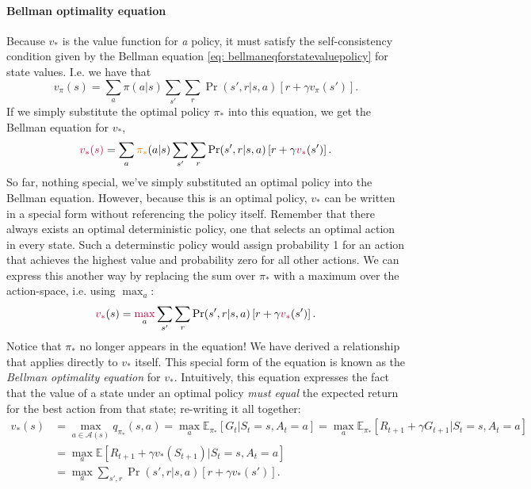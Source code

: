 \documentclass[12pt]{article}
\begin{document}
\paragraph{Bellman optimality equation}
Because $v_*$ is the value function for \emph{a} policy, it must satisfy the self-consistency condition given by the Bellman equation \ref{eq:   bellmaneqforstatevaluepolicy} for state values. I.e. we have that
\[
  v_\pi(s) = \sum_a \pi(a|s) \sum_{s'} \sum_r \Pr(s', r | s, a) \left[ r + \gamma v_\pi(s')\right].
\]
If we simply substitute the optimal policy $\pi_*$ into this equation, we get the Bellman equation for $v_*$,
\[
  \color{purple} v_*(s) \color{black} = \sum_a \color{orange} \pi_* \color{black} (a|s) \sum_{s'} \sum_r \Pr(s', r | s, a) \left[ r + \gamma \color{purple} v_* \color{black} (s') \right].
\]
So far, nothing special, we've simply substituted an optimal policy into the Bellman equation. However, because this is an optimal policy, $v_*$ can be written in a special form without referencing the policy itself. Remember that there always exists an optimal deterministic policy, one that selects an optimal action in every state. Such a determinstic policy would assign probability 1 for an action that achieves the highest value and probability zero for all other actions. We can express this another way by replacing the sum over $\pi_*$ with a maximum over the action-space, i.e. using $\max_a$:
\begin{equation}
  \label{eq: bellmanoptimalityequationforvstar}
\color{purple} v_* \color{black} (s) = \color{purple} \max_{\color{black} a} \color{black} \sum_{s'} \sum_r \Pr(s', r | s,a) \left[ r + \gamma \color{purple} v_* \color{black}(s')\right].
\end{equation}
Notice that $\pi_*$ no longer appears in the equation! We have derived a relationship that applies directly to $v_*$ itself. This 
special form of the equation is known as the \emph{Bellman optimality equation} for $v_*$. Intuitively, this equation expresses the fact that the value of a state under an optimal policy \emph{must equal} the expected return for the best action from that state; re-writing it all together:
\begin{align}
  v_*(s) &= \max_{a \in \mathcal A(s)} q_{\pi_*} (s,a) = \max_a \mathbb E_{\pi_*} \left[G_t | S_t = s, A_t = a \right] = \max_a \mathbb E_{\pi_*} \left[R_{t+1} +            \gamma G_{t+1} | S_t = s, A_t = a \right] \nonumber \\
         &= \max_a \mathbb E \left[R_{t+1} + \gamma v_*(S_{t+1}) | S_t = s, A_t                       = a \right] \\
  \label{eq: bellmanoptimalityequationforpi}
         &= \max_a \sum_{s',r} \Pr(s', r|s,a) \left[r + \gamma v_*(s')\right].
\end{align}
\end{document}
